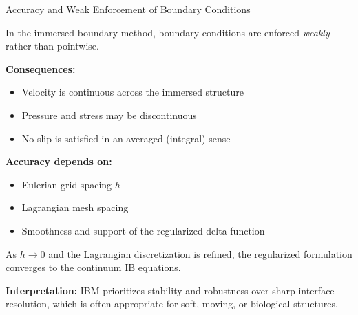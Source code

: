 \documentclass{beamer}
\begin{document}
\begin{frame}{Accuracy and Weak Enforcement of Boundary Conditions}
\small

In the immersed boundary method, boundary conditions are enforced
\emph{weakly} rather than pointwise.

\medskip

\textbf{Consequences:}
\begin{itemize}
    \item Velocity is continuous across the immersed structure
    \item Pressure and stress may be discontinuous
    \item No-slip is satisfied in an averaged (integral) sense
\end{itemize}

\medskip

\textbf{Accuracy depends on:}
\begin{itemize}
    \item Eulerian grid spacing $h$
    \item Lagrangian mesh spacing
    \item Smoothness and support of the regularized delta function
\end{itemize}

\medskip

As $h \rightarrow 0$ and the Lagrangian discretization is refined,
the regularized formulation converges to the continuum IB equations.

\medskip

\textbf{Interpretation:}  
IBM prioritizes stability and robustness over sharp interface resolution,
which is often appropriate for soft, moving, or biological structures.

\end{frame}
\end{document}
